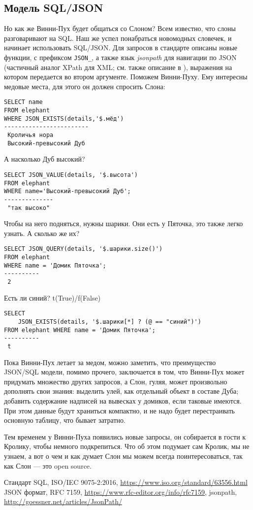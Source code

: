 \documentclass[10pt, a5paper]{article}
\begin{document}
\subsection*{Модель SQL/JSON}
Но как же Винни-Пух будет общаться со Слоном?
Всем известно, что слоны разговаривают на SQL. 
Наш же успел понабраться новомодных словечек, и начинает использовать SQL/JSON.
Для запросов в стандарте описаны новые функции, с префиксом \texttt{JSON\_},
а также язык \textit{jsonpath} для навигации по JSON 
(частичный аналог XPath для XML; см. также описание в \cite{AY3}),
выражения на котором передается во втором аргументе. 
Поможем Винни-Пуху. Ему интересны медовые места, для этого он должен спросить Слона:
\begin{verbatim}
SELECT name 
FROM elephant 
WHERE JSON_EXISTS(details,'$.мёд')
------------------------
 Кроличья нора
 Высокий-превысокий Дуб
\end{verbatim}
А насколько Дуб высокий?
\begin{verbatim}
SELECT JSON_VALUE(details, '$.высота') 
FROM elephant 
WHERE name='Высокий-превысокий Дуб';
--------------
 "так высоко"
\end{verbatim}
Чтобы на него подняться, нужны шарики. 
Они есть у Пяточка, это также легко узнать. А сколько же их? 
\begin{verbatim}
SELECT JSON_QUERY(details, '$.шарики.size()') 
FROM elephant 
WHERE name = 'Домик Пяточка';
----------
 2
\end{verbatim}
Есть ли синий? t(True)/f(False)
\begin{verbatim}
SELECT 
    JSON_EXISTS(details, '$.шарики[*] ? (@ == "синий")') 
FROM elephant WHERE name = 'Домик Пяточка';
----------
 t
\end{verbatim}

Пока Винни-Пух летает за медом, можно заметить, что
преимущество JSON/SQL модели, помимо прочего, заключается в том, что Винни-Пух
может придумать множество других запросов, 
а Слон, гуляя, может произвольно дополнять свои знания:
выделить улей, как отдельный объект в составе Дуба; 
добавить содержание надписей на вывесках у домиков, если таковые имеются.
При этом данные будут храниться компактно, и не надо будет перестраивать основную таблицу, что бывает затратно.

Тем  временем у Винни-Пуха появились новые запросы, он собирается в гости к Кролику, чтобы немного подкрепиться.  
Что об этом подумает сам Кролик, мы не узнаем, а вот о чем и как думает Слон мы можем всегда поинтересоваться,
так как Слон --- это open source.

\begin{thebibliography}{9}
 Стандарт SQL, ISO/IEC 9075-2:2016, \url{https://www.iso.org/standard/63556.html}
 JSON формат, RFC 7159, \url{https://www.rfc-editor.org/info/rfc7159}, 
 jsonpath, \url{http://goessner.net/articles/JsonPath/}
\end{thebibliography}
\end{document}
